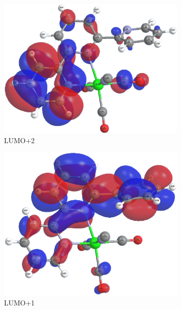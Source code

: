 \begin{figure}[!ht]
 \centering
 \begin{subfigure}[b]{0.31\textwidth}
  \includegraphics[clip=true, width=\textwidth, keepaspectratio]{images/mos/5l+2.eps}
  \caption{LUMO+2}
 \end{subfigure}
  \begin{subfigure}[b]{0.31\textwidth}
  \includegraphics[clip=true, width=\textwidth, keepaspectratio]{images/mos/5l+1.eps}
  \caption{LUMO+1}
 \end{subfigure}
  \begin{subfigure}[b]{0.31\textwidth}

\end{subfigure}
\end{figure}

